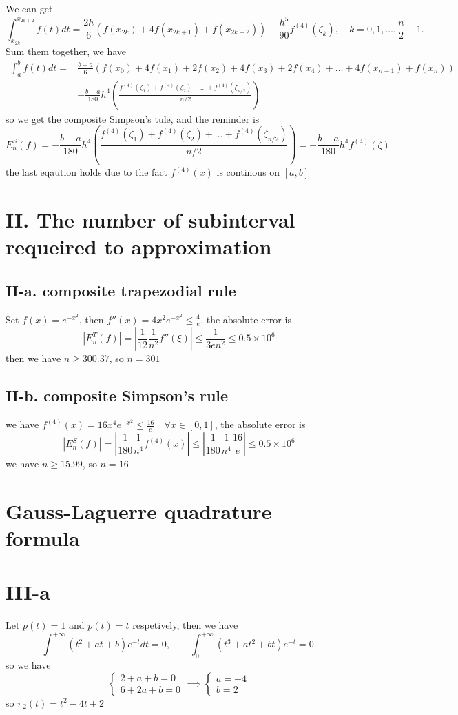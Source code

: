 \documentclass[a4paper]{article}
\begin{document}
We can get\[\int_{x_{2k}}^{x_{2k+2}}f(t)dt = \frac{2h}{6}(f(x_{2k})+ 4f(x_{2k+1}) + f(x_{2k+2})) - \frac{h^5}{90}f^{(4)}(\zeta_k),\quad k = 0,1,\ldots,\frac{n}{2}-1.\]
Sum them together, we have 
\begin{align*}
    \int_{a}^{b}f(t)dt = &\frac{b-a}{6}(f(x_0) + 4f(x_1) + 2f(x_2) + 4f(x_3) + 2f(x_4) + \ldots + 4f(x_{n-1}) + f(x_n))    \\
    &-\frac{b-a}{180}h^4\left( \frac{f^{(4)}(\zeta_1) + f^{(4)}(\zeta_2) + \ldots + f^{(4)}(\zeta_{n/2})}{n/2} \right) 
\end{align*}
so we get the composite Simpson's tule, and the reminder is
\[E^S_n(f) =-\frac{b-a}{180}h^4\left( \frac{f^{(4)}(\zeta_1) + f^{(4)}(\zeta_2) + \ldots + f^{(4)}(\zeta_{n/2})}{n/2} \right)  
= -\frac{b-a}{180}h^4f^{(4)}(\zeta)\]
the last eqaution holds due to the fact \(f^{(4)}(x)\) is continous on \([a,b]\)

\section*{II. The number of subinterval requeired to approximation}
\subsection*{II-a. composite trapezodial rule}
Set \(f(x) = e^{-x^2}\), then \(f''(x) = 4x^2e^{-x^2} \leq \frac{4}{e}\), the absolute error is 
\[ \left|E_n^T(f)\right|  = \left|\frac{1}{12}\frac{1}{n^2}f''(\xi)\right| \leq \frac{1}{3en^2}\leq0.5\times 10^6\]
then we have \(n \geq 300.37\), so \(n = 301\)
\subsection*{II-b. composite Simpson's rule}
we have \(f^{(4)} (x) = 16 x^4 e^{-x^2} \leq \frac{16}{e} \quad \forall x \in [0,1]\), the absolute error is
\[|E^S_n(f) |= \left|\frac{1}{180}\frac{1}{n^4}f^{(4)}(x)\right| \leq \left|\frac{1}{180}\frac{1}{n^4}\frac{16}{e}\right|\leq0.5\times 10^6 \]
we have \(n\ge 15.99\), so \(n = 16\)

\section*{Gauss-Laguerre quadrature formula}
\section*{III-a}
Let \(p(t) = 1\) and \( p(t) = t\) respetively, then we have 
\[\int_{0}^{+\infty}(t^2 + at + b)e^{-t} dt= 0,\qquad \int_{0}^{+\infty} (t^3 + at^2 + bt)e^{-t} = 0.\]
so we have \[
\begin{cases}
    2+a+b = 0\\
    6+2a+b=0
\end{cases}\implies\begin{cases}
    a = -4\\b=2
\end{cases}
\]
so \(\pi_2(t) = t^2 -4t+2\)
\end{document}

